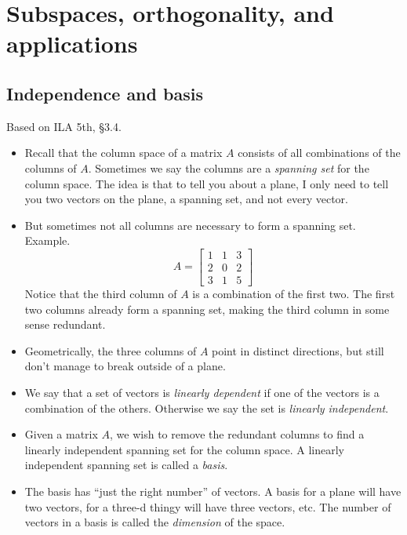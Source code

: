 \documentclass[11pt,oneside]{amsbook}
\theoremstyle{definition}
\theoremstyle{plain}
\theoremstyle{definition}
\theoremstyle{remark}
\numberwithin{equation}{section}
\numberwithin{figure}{section}
\begin{document}
\chapter{Subspaces, orthogonality, and applications}

\section{Independence and basis}

Based on ILA 5th, \S 3.4.

\begin{itemize}
\item Recall that the column space of a matrix $A$ consists of all combinations of the columns of $A$. Sometimes we say the columns are a \emph{spanning set} for the column space. The idea is that to tell you about a plane, I only need to tell you two vectors on the plane, a spanning set, and not every vector.
\item But sometimes not all columns are necessary to form a spanning set. Example.
  \[A=\begin{bmatrix}1&1&3\\2&0&2\\3&1&5\end{bmatrix}
  \]
  Notice that the third column of $A$ is a combination of the first two. The first two columns already form a spanning set, making the third column in some sense redundant.
\item Geometrically, the three columns of $A$ point in distinct directions, but still don't manage to break outside of a plane.
\item We say that a set of vectors is \emph{linearly dependent} if one of the vectors is a combination of the others. Otherwise we say the set is \emph{linearly independent}.
\item Given a matrix $A$, we wish to remove the redundant columns to find a linearly independent spanning set for the column space. A linearly independent spanning set is called a \emph{basis}.
\item The basis has ``just the right number'' of vectors. A basis for a plane will have two vectors, for a three-d thingy will have three vectors, etc. The number of vectors in a basis is called the \emph{dimension} of the space.

\end{itemize}
\end{document}
